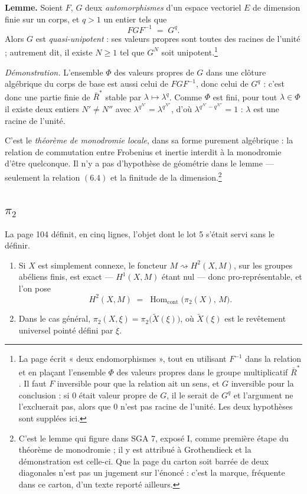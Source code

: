 \documentclass[11pt,a4paper]{article}
\begin{document}
\textbf{Lemme.} Soient $F$, $G$ deux \emph{automorphismes} d'un espace
vectoriel $E$ de dimension finie sur un corps, et $q > 1$ un entier tels que
\[
  F G F^{-1} \;=\; G^{q} .
\]
Alors $G$ est \emph{quasi-unipotent} : ses valeurs propres sont toutes des
racines de l'unité ; autrement dit, il existe $N \geqslant 1$ tel que $G^{N}$
soit unipotent.\footnote{La page écrit « deux endomorphismes », tout en
utilisant $F^{-1}$ dans la relation et en plaçant l'ensemble $\Phi$ des valeurs
propres dans le groupe multiplicatif $\bar{R}^{*}$. Il faut $F$ inversible pour
que la relation ait un sens, et $G$ inversible pour la conclusion : si $0$
était valeur propre de $G$, il le serait de $G^{q}$ et l'argument ne
l'excluerait pas, alors que $0$ n'est pas racine de l'unité. Les deux
hypothèses sont supplées ici.}

\emph{Démonstration.} L'ensemble $\Phi$ des valeurs propres de $G$ dans une
clôture algébrique du corps de base est aussi celui de $FGF^{-1}$, donc celui
de $G^{q}$ : c'est donc une partie finie de $\bar{R}^{*}$ stable par
$\lambda \mapsto \lambda^{q}$. Comme $\Phi$ est fini, pour tout
$\lambda \in \Phi$ il existe deux entiers $N' \neq N''$ avec
$\lambda^{q^{N'}} = \lambda^{q^{N''}}$, d'où $\lambda^{q^{N'} - q^{N''}} = 1$ :
$\lambda$ est une racine de l'unité.

C'est le \emph{théorème de monodromie locale}, dans sa forme purement
algébrique : la relation de commutation entre Frobenius et inertie interdit à
la monodromie d'être quelconque. Il n'y a pas d'hypothèse de géométrie dans le
lemme --- seulement la relation $(6.4)$ et la finitude de la
dimension.\footnote{C'est le lemme qui figure dans SGA 7, exposé I, comme
première étape du théorème de monodromie ; il y est attribué à Grothendieck et
la démonstration est celle-ci. Que la page du carton soit barrée de deux
diagonales n'est pas un jugement sur l'énoncé : c'est la marque, fréquente dans
ce carton, d'un texte reporté ailleurs.}

\subsection*{$\pi_{2}$}

La page 104 définit, en cinq lignes, l'objet dont le lot 5 s'était servi sans
le définir.

\begin{enumerate}
  \item[a)] Si $X$ est simplement connexe, le foncteur
    $M \rightsquigarrow H^{2}(X, M)$, sur les groupes abéliens finis, est
    exact --- $H^{1}(X, M)$ étant nul --- donc pro-représentable, et l'on pose
    \[
      H^{2}(X, M) \;=\; \operatorname{Hom}_{\mathrm{cont}}
      \bigl(\pi_{2}(X),\, M\bigr) .
    \]
  \item[b)] Dans le cas général, $\pi_{2}(X, \xi) = \pi_{2}\bigl(\tilde{X}(\xi)
    \bigr)$, où $\tilde{X}(\xi)$ est le revêtement universel pointé défini par
    $\xi$.
\end{enumerate}
\end{document}
